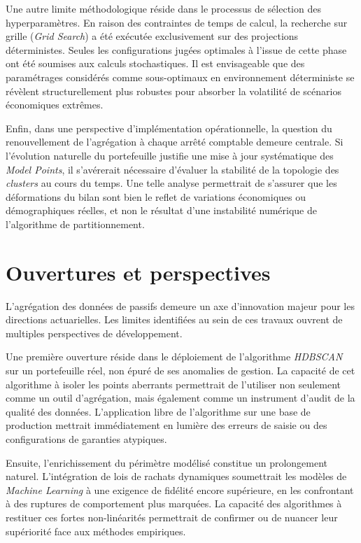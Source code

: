 Une autre limite méthodologique réside dans le processus de sélection des hyperparamètres. En raison des contraintes de temps de calcul, la recherche sur grille (\textit{Grid Search}) a été exécutée exclusivement sur des projections déterministes. Seules les configurations jugées optimales à l'issue de cette phase ont été soumises aux calculs stochastiques. Il est envisageable que des paramétrages considérés comme sous-optimaux en environnement déterministe se révèlent structurellement plus robustes pour absorber la volatilité de scénarios économiques extrêmes.

Enfin, dans une perspective d'implémentation opérationnelle, la question du renouvellement de l'agrégation à chaque arrêté comptable demeure centrale. Si l'évolution naturelle du portefeuille justifie une mise à jour systématique des \textit{Model Points}, il s'avérerait nécessaire d'évaluer la stabilité de la topologie des \textit{clusters} au cours du temps. Une telle analyse permettrait de s'assurer que les déformations du bilan sont bien le reflet de variations économiques ou démographiques réelles, et non le résultat d'une instabilité numérique de l'algorithme de partitionnement.

\section*{Ouvertures et perspectives}

L'agrégation des données de passifs demeure un axe d'innovation majeur pour les directions actuarielles. Les limites identifiées au sein de ces travaux ouvrent de multiples perspectives de développement.

Une première ouverture réside dans le déploiement de l'algorithme \textit{HDBSCAN} sur un portefeuille réel, non épuré de ses anomalies de gestion. La capacité de cet algorithme à isoler les points aberrants permettrait de l'utiliser non seulement comme un outil d'agrégation, mais également comme un instrument d'audit de la qualité des données. L'application libre de l'algorithme sur une base de production mettrait immédiatement en lumière des erreurs de saisie ou des configurations de garanties atypiques.

Ensuite, l'enrichissement du périmètre modélisé constitue un prolongement naturel. L'intégration de lois de rachats dynamiques soumettrait les modèles de \textit{Machine Learning} à une exigence de fidélité encore supérieure, en les confrontant à des ruptures de comportement plus marquées. La capacité des algorithmes à restituer ces fortes non-linéarités permettrait de confirmer ou de nuancer leur supériorité face aux méthodes empiriques.

